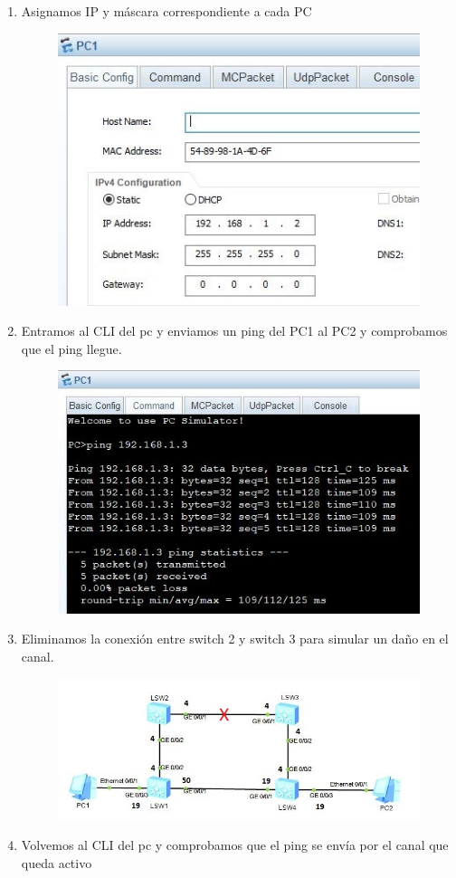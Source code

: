 \documentclass[journal]{IEEEtran}
\begin{document}
\begin{enumerate}
	\item Asignamos IP y máscara correspondiente a cada PC
	
	\begin{figure}[ht]
		\centering
		\includegraphics[scale=0.6]{7.jpg}
	\end{figure}

	\item Entramos al CLI del pc y enviamos un ping del PC1 al PC2 y comprobamos que el ping llegue.
	
	\newpage
	
	\begin{figure}[ht]
		\centering
		\includegraphics[scale=0.6]{8.jpg}
	\end{figure}

	\item Eliminamos la conexión entre switch 2 y switch 3 para simular un daño en el canal.
	
	\begin{figure}[ht]
		\centering
		\includegraphics[scale=0.55]{6.jpg}
	\end{figure}

	\item Volvemos al CLI del pc y comprobamos que el ping se envía por el canal que queda activo
\end{enumerate}
\end{document}
